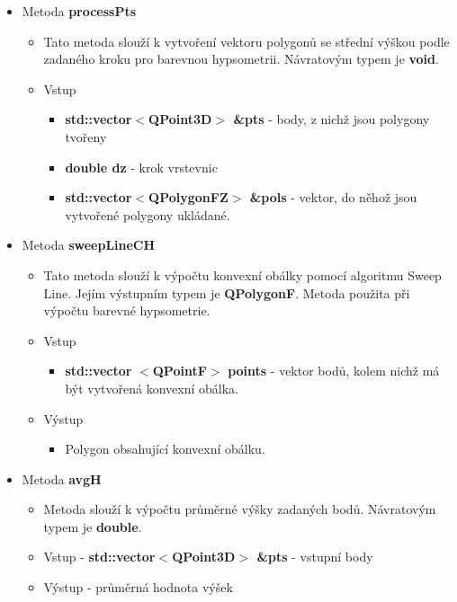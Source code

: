 \documentclass[a4paper, 12pt]{article}
\begin{document}
\begin{itemize}
\item Metoda \textbf{processPts}
\begin{itemize}
	\item Tato metoda slouží k vytvoření vektoru polygonů se střední výškou podle zadaného kroku pro barevnou hypsometrii. Návratovým typem je \textbf{void}.
	\item Vstup
	\begin{itemize}
		\item \textbf{std::vector$<$QPoint3D$>$ \&pts} - body, z nichž jsou polygony tvořeny
		\item \textbf{double dz} - krok vrstevnic
		\item \textbf{std::vector$<$QPolygonFZ$>$ \&pols} - vektor, do něhož jsou vytvořené polygony ukládané.
	\end{itemize}
\end{itemize}

	\item Metoda \textbf{sweepLineCH}
\begin{itemize}
	\item Tato metoda slouží k výpočtu konvexní obálky pomocí algoritmu Sweep Line. Jejím výstupním typem je \textbf{QPolygonF}. Metoda použita při výpočtu barevné hypsometrie.
	\item Vstup
	\begin{itemize}
		\item \textbf{std::vector} $<$\textbf{QPointF}$>$ \textbf{points} - vektor bodů, kolem nichž má být vytvořená konvexní obálka.
	\end{itemize}
	\item Výstup
	\begin{itemize}
		\item Polygon obsahující konvexní obálku.
	\end{itemize} 
\end{itemize}

\item Metoda \textbf{avgH}
\begin{itemize}
	\item Metoda slouží k výpočtu průměrné výšky zadaných bodů. Návratovým typem je \textbf{double}.
	\item Vstup - \textbf{std::vector$<$QPoint3D$>$ \&pts} - vstupní body
	\item Výstup - průměrná hodnota výšek
	
\end{itemize}

\end{itemize}	
\end{document}
